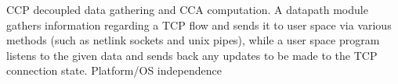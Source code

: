 \documentclass[../main.tex]{subfiles}
\begin{document}
CCP decoupled data gathering and CCA computation. A datapath module gathers information regarding a TCP flow and sends it to user space via various methods (such as netlink sockets and unix pipes), while a user space program listens to the given data and sends back any updates to be made to the TCP connection state. Platform/OS independence
\end{document}
